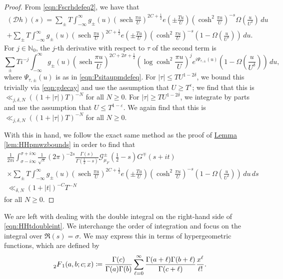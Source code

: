 \documentclass[11pt,a4paper]{amsart}
\newcommand{\Dscr}{\mathscr{D}}
\newcommand{\e}{\varepsilon}
\newcommand{\Gscr}{\mathscr{G}}
\newcommand{\N}{\mathbb{N}}
\DeclareMathOperator{\sech}{sech}
\numberwithin{equation}{section}
\theoremstyle{remark}
\theoremstyle{definition}
\begin{document}
\begin{proof}
From \eqref{eqn:Fscrhdefeq2}, we have that
\begin{multline*}
(\Dscr h)(s) = \sum_{\pm} T \int_{-\infty}^{\infty} g_{\pm}(u) \left(\sech \frac{\pi u}{U}\right)^{2C + \frac{1}{2}} e\left(\pm \frac{Tu}{U}\right) \left(\cosh^2 \frac{\pi u}{U}\right)^{-s} \Omega\left(\frac{u}{U^{\delta}}\right) \, du	\\
+ \sum_{\pm} T \int_{-\infty}^{\infty} g_{\pm}(u) \left(\sech \frac{\pi u}{U}\right)^{2C + \frac{1}{2}} e\left(\pm \frac{Tu}{U}\right) \left(\cosh^2 \frac{\pi u}{U}\right)^{-s} \left(1 - \Omega\left(\frac{u}{U^{\delta}}\right)\right) \, du.
\end{multline*}
For $j \in \N_0$, the $j$-th derivative with respect to $\tau$ of the second term is
\[\sum_{\pm} T i^{-j} \int_{-\infty}^{\infty} g_{\pm}(u) \left(\sech \frac{\pi u}{U}\right)^{2C + 2\sigma + \frac{1}{2}} \left(\log \cosh^2 \frac{\pi u}{U}\right)^j e^{i\Psi_{\tau,\pm}(u)} \left(1 - \Omega\left(\frac{u}{U^{\delta}}\right)\right) \, du,\]
where $\Psi_{\tau,\pm}(u)$ is as in \eqref{eqn:Psitaupmdefeq}. For $|\tau| \leq TU^{1 - 2\delta}$, we bound this trivially via \eqref{eqn:gdecay} and use the assumption that $U \geq T^{\e}$; we find that this is $\ll_{j,\delta,N} ((1 + |\tau|) T)^{-N}$ for all $N \geq 0$. For $|\tau| \geq TU^{1 - 2\delta}$, we integrate by parts and use the assumption that $U \leq T^{1 - \e}$. We again find that this is $\ll_{j,\delta,N} ((1 + |\tau|) T)^{-N}$ for all $N \geq 0$.

With this in hand, we follow the exact same method as the proof of \hyperref[lem:HHpmwzbounds]{Lemma \ref*{lem:HHpmwzbounds}} in order to find that
\begin{multline*}
\frac{1}{2\pi i} \int_{\sigma - i\infty}^{\sigma + i\infty} \frac{1}{\sqrt{\pi}} (2\pi)^{-2s} \frac{\Gamma(s)}{\Gamma\left(\frac{1}{2} - s\right)} \Gscr_{\mu_F}^{\pm}\left(\frac{1}{2} - s\right) G^{\mp}(s + it)	\\
\times \sum_{\pm} T \int_{-\infty}^{\infty} g_{\pm}(u) \left(\sech \frac{\pi u}{U}\right)^{2C + \frac{1}{2}} e\left(\pm \frac{Tu}{U}\right) \left(\cosh^2 \frac{\pi u}{U}\right)^{-s} \left(1 - \Omega\left(\frac{u}{U^{\delta}}\right)\right) \, du \, ds	\\
\ll_{\delta,N} (1 + |t|)^{-C} T^{-N}
\end{multline*}
for all $N \geq 0$.
\end{proof}

We are left with dealing with the double integral on the right-hand side of \eqref{eqn:HHtdoubleint}. We interchange the order of integration and focus on the integral over $\Re(s) = \sigma$. We may express this in terms of hypergeometric functions, which are defined by
\begin{equation}
\label{eqn:hypergeometric}
\prescript{}{2}{F}_1(a,b;c;x) \coloneqq \frac{\Gamma(c)}{\Gamma(a) \Gamma(b)} \sum_{\ell = 0}^{\infty} \frac{\Gamma(a + \ell) \Gamma(b + \ell)}{\Gamma(c + \ell)} \frac{x^{\ell}}{\ell!}.
\end{equation}
\end{document}
